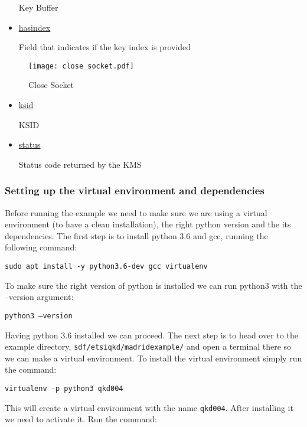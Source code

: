\begin{refsection}
\begin{itemize}
		Key Buffer

	\item\underline{has\textunderscore index}

		Field that indicates if the key index is provided

\end{itemize}

\begin{figure}[H]
	\centering
	\texttt{[image: close\_socket.pdf]}
	\caption{Close Socket}
	\label{fig:close}
\end{figure}

\begin{itemize}

	\item\underline{ksid}

		KSID

	\item\underline{status}

		Status code returned by the KMS

\end{itemize}

\subsubsection{Setting up the virtual environment and dependencies}

Before running the example we need to make sure we are using a virtual environment (to have a clean installation), the right python version and the its dependencies.
The first step is to install python 3.6 and gcc, running the following command:

\texttt{sudo apt install -y python3.6-dev gcc virtualenv}

To make sure the right version of python is installed we can run python3 with the --version argument: 

\texttt{python3 --version}

Having python 3.6 installed we can proceed. The next step is to head over to the example directory, \texttt{sdf/etsi\textunderscore qkd/madrid\textunderscore example/} and open a terminal there so we can make a virtual environment. To install the virtual environment simply run the command:

\texttt{virtualenv -p python3 qkd004}

This will create a virtual environment with the name \texttt{qkd004}. After installing it we need to activate it. Run the command:


\end{refsection}
